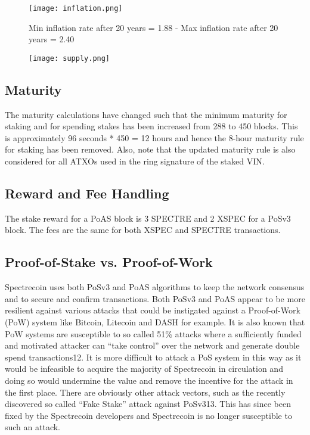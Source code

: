\begin{figure}
	\centering
	\texttt{[image: inflation.png]}
	\caption{Min inflation rate after 20 years = 1.88 - Max inflation rate after 20 years = 2.40 }
	\centering
	\texttt{[image: supply.png]}
	\caption{}
\end{figure}



\subsection{Maturity}
The maturity calculations have changed such that the minimum maturity for
staking and for spending stakes has been increased from 288 to 450 blocks.
This is approximately 96 seconds * 450 = 12 hours and hence the 8-hour
maturity rule for staking has been removed. Also, note that the updated
maturity rule is also considered for all ATXOs used in the ring signature
of the staked VIN.



\subsection{Reward and Fee Handling}
The stake reward for a PoAS block is 3 SPECTRE and 2 XSPEC for a PoSv3 block.
The fees are the same for both XSPEC and SPECTRE transactions.



\subsection{Proof-of-Stake vs. Proof-of-Work}
Spectrecoin uses both PoSv3 and PoAS algorithms to keep the network consensus
and to secure and confirm transactions. Both PoSv3 and PoAS appear to be more
resilient against various attacks that could be instigated against a
Proof-of-Work (PoW) system like Bitcoin, Litecoin and DASH for example.
It is also known that PoW systems are susceptible to so called 51\% attacks
where a sufficiently funded and motivated attacker can “take control” over
the network and generate double spend transactions12. It is more difficult
to attack a PoS system in this way as it would be infeasible to acquire the
majority of Spectrecoin in circulation and doing so would undermine the value
and remove the incentive for the attack in the first place. There are obviously
other attack vectors, such as the recently discovered so called “Fake Stake”
attack against PoSv313. This has since been fixed by the Spectrecoin developers
and Spectrecoin is no longer susceptible to such an attack.



